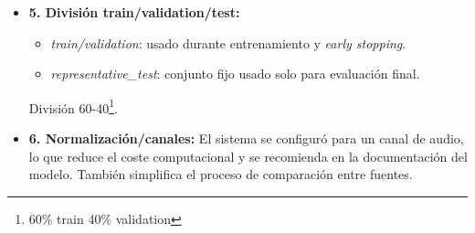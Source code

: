 \begin{itemize}
    La versión final del proceso de entrenamiento comprueba la presencia de estos dos últimos para las funciones que las piden, y usa \texttt{source\_magnitudes} como \textit{target} principal durante el entrenamiento.

    \item \textbf{5. División train/validation/test:}
    \begin{itemize}
        \item \textit{train/validation}: usado durante entrenamiento y \textit{early stopping}.
        \item \textit{representative\_test}: conjunto fijo usado solo para evaluación final.
    \end{itemize}
    División 60-40\footnote{60\% train 40\% validation}.

    \item \textbf{6. Normalización/canales:}
    El sistema se configuró para un canal de audio, lo que reduce el coste computacional y se recomienda en la documentación del modelo\cite{rafii2018overview}. También simplifica el proceso de comparación entre fuentes.

\end{itemize}

